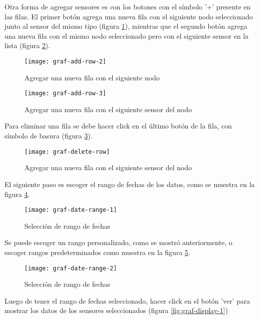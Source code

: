 Otra forma de agregar sensores es con los botones con el símbolo '+' presente en las filas. El primer botón agrega una nueva fila con el siguiente nodo seleccionado junto al sensor del mismo tipo (figura \ref{fig:graf-add-row-2}), mientras que el segundo botón agrega una nueva fila con el mismo nodo seleccionado pero con el siguiente sensor en la lista (figura \ref{fig:graf-add-row-3}).

\begin{figure}[H]
	\centering
	\texttt{[image: graf-add-row-2]}
	\caption{\label{fig:graf-add-row-2} Agregar una nueva fila con el siguiente nodo}
\end{figure}

\begin{figure}[H]
	\centering
	\texttt{[image: graf-add-row-3]}
	\caption{\label{fig:graf-add-row-3} Agregar una nueva fila con el siguiente sensor del nodo}
\end{figure}

Para eliminar una fila se debe hacer click en el último botón de la fila, con símbolo de basura (figura \ref{fig:graf-delete-row}).

\begin{figure}[H]
	\centering
	\texttt{[image: graf-delete-row]}
	\caption{\label{fig:graf-delete-row} Agregar una nueva fila con el siguiente sensor del nodo}
\end{figure}

El siguiente paso es escoger el rango de fechas de los datos, como se muestra en la figura \ref{fig:graf-date-range-1}.

\begin{figure}[H]
	\centering
	\texttt{[image: graf-date-range-1]}
	\caption{\label{fig:graf-date-range-1} Selección de rango de fechas}
\end{figure}

Se puede escoger un rango personalizado, como se mostró anteriormente, o escoger rangos predeterminados como muestra en la figura \ref{fig:graf-date-range-2}.

\begin{figure}[H]
	\centering
	\texttt{[image: graf-date-range-2]}
	\caption{\label{fig:graf-date-range-2} Selección de rango de fechas}
\end{figure}

Luego de tener el rango de fechas seleccionado, hacer click en el botón 'ver' para mostrar los datos de los sensores seleccionados (figura \ref{fig:graf-display-1})

